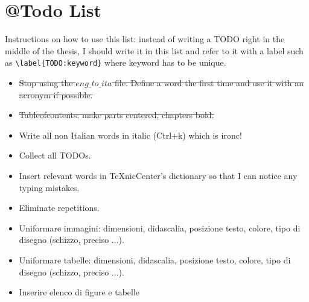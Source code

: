 \chapter*{@Todo List}
Instructions on how to use this list: instead of writing a TODO right in the middle of the thesis, I should write it in this list and refer to it with a label such as \verb|\label{TODO:keyword}|
where keyword has to be unique.
\begin{itemize}
	\item \sout{Stop using the $eng\_to\_ita$ file. Define a word the first time and use it with an acronym if possible.}
	\item \sout{Tableofcontents: make parts centered, chapters bold.}
	\item Write all non Italian words in italic (Ctrl+k) which is ironc! 
	\item Collect all TODOs. 
	\item Insert relevant words in TeXnicCenter's dictionary so that I can notice any typing mistakes.
	\item Eliminate repetitions.
	\item Uniformare immagini: dimensioni, didascalia, posizione testo, colore, tipo di disegno (schizzo, preciso ...).
	\item Uniformare tabelle: dimensioni, didascalia, posizione testo, colore, tipo di disegno (schizzo, preciso ...).
	\item Inserire elenco di figure e tabelle 
\end{itemize}
